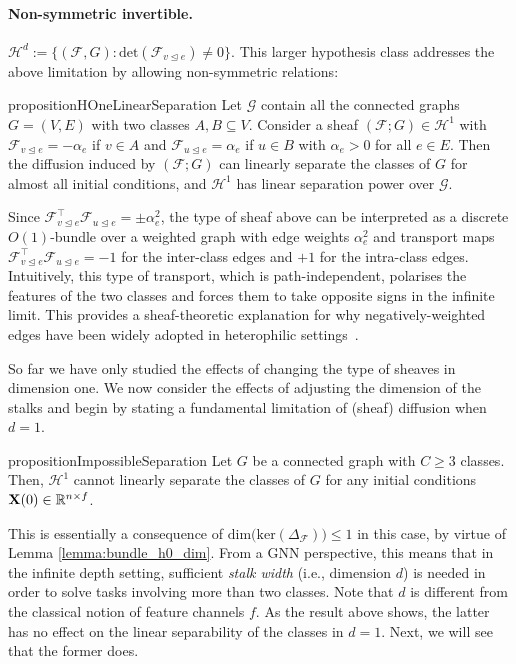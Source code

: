 \documentclass{article}
\def\mX{{\bf{X}}}
\def\gF{{\mathcal{F}}}
\def\gG{{\mathcal{G}}}
\def\gH{{\mathcal{H}}}
\def\sR{{\mathbb{R}}}
\newcommand{\tleq}{\trianglelefteq}
\begin{document}
\paragraph*{Non-symmetric invertible.}
$\gH^d := \{ (\gF, G) : \mathrm{det}(\gF_{v \tleq e}) \neq 0\}$. This larger hypothesis class addresses the above limitation by allowing non-symmetric relations:

\begin{restatable}{proposition}{HOneLinearSeparation}\label{prop:h1_linear_separation}
Let $\gG$ contain all the connected graphs $G = (V, E)$ with two classes $A, B \subseteq V$. Consider a sheaf $(\gF; G) \in \gH^1$ with $\gF_{v \tleq e} = -\alpha_e$ if $v \in A$ and $\gF_{u \tleq e} = \alpha_e$ if $u \in B$ with $\alpha_e > 0$ for all $e \in E$. Then the diffusion induced by $(\gF; G)$ can linearly separate the classes of $G$ for almost all initial conditions, and $\gH^1$ has linear separation power over $\gG$. 
\end{restatable}
\vspace{-5pt}
Since $\gF_{v \tleq e}^\top \gF_{u \tleq e} = \pm \alpha_e^2$, the type of sheaf above can be interpreted as a discrete $O(1)$-bundle over a weighted graph with edge weights $\alpha_e^2$ and transport maps $\gF^\top_{v \tleq e}\gF_{u \tleq e} = -1$ for the inter-class edges and $+1$ for the intra-class edges. Intuitively, this type of transport, which is path-independent, polarises the features of the two classes and forces them to take opposite signs in the infinite limit. This provides a sheaf-theoretic explanation for why negatively-weighted edges have been widely adopted in heterophilic settings~\citep{yan2021two, chien2021adaptive, fagcn2021}. 

So far we have only studied the effects of changing the type of sheaves in dimension one. We now consider the effects of adjusting the dimension of the stalks and begin by stating a fundamental limitation of (sheaf) diffusion when $d=1$. 
\begin{restatable}{proposition}{ImpossibleSeparation}\label{prop:impossible_separation}
Let $G$ be a connected graph with $C \geq 3$ classes. Then, $\gH^1$ cannot linearly separate the classes of $G$ for any initial conditions $\mX(0) \in \sR^{n \times f}$. 
\end{restatable}
This is essentially a consequence of  $\mathrm{dim}\big(\mathrm{ker}(\Delta_\gF)\big)\leq 1$ in this case, by virtue of Lemma \ref{lemma:bundle_h0_dim}. From a GNN perspective, this means that in the infinite depth setting, sufficient \emph{stalk width} (i.e., dimension $d$) is needed in order to solve tasks involving more than two classes. Note that $d$ is different from the classical notion of feature channels $f$. As the result above shows, the latter has no effect on the linear separability of the classes in $d=1$. Next, we will see that the former does. 
\end{document}
